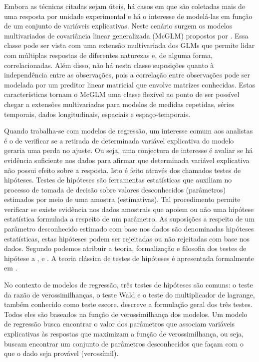 Embora as técnicas citadas sejam úteis, há casos em que são coletadas mais de uma resposta por unidade experimental e há o interesse de modelá-las em função de um conjunto de variáveis explicativas. Neste cenário surgem os modelos multivariados de covariância linear generalizada (McGLM) propostos por \citet{Bonat16}. Essa classe pode ser vista com uma extensão multivariada dos GLMs que permite lidar com múltiplas respostas de diferentes naturezas e, de alguma forma, correlacionadas. Além disso, não há nesta classe suposições quanto à independência entre as observações, pois a correlação entre observações pode ser modelada por um preditor linear matricial que envolve matrizes conhecidas. Estas características tornam o McGLM uma classe flexível ao ponto de ser possível chegar a extensões multivariadas para modelos de medidas repetidas, séries temporais, dados longitudinais, espaciais e espaço-temporais.


Quando trabalha-se com modelos de regressão, um interesse comum aos analistas é o de verificar se a retirada de determinada variável explicativa do modelo geraria uma perda no ajuste. Ou seja, uma conjectura de interesse é avaliar se há evidência suficiente nos dados para afirmar que determinada variável explicativa não possui efeito sobre a resposta. Isto é feito através dos chamados testes de hipóteses. Testes de hipóteses são ferramentas estatísticas que auxiliam no processo de tomada de decisão sobre valores desconhecidos (parâmetros) estimados por meio de uma amostra (estimativas). Tal procedimento permite verificar se existe evidência nos dados amostrais que apoiem ou não uma hipótese estatística formulada a respeito de um parâmetro. As suposições a respeito de um parâmetro desconhecido estimado com base nos dados são denominadas hipóteses estatísticas, estas hipóteses podem ser rejeitadas ou não rejeitadas com base nos dados. Segundo \citet{lehmann} podemos atribuir a teoria, formalização e filosofia dos testes de hipótese a \citet{neyman1}, \citet{neyman2} e \citet{fisher}. A teoria clássica de testes de hipóteses é apresentada formalmente em \citet{lehmann2}.

No contexto de modelos de regressão, três testes de hipóteses são comuns: o teste da razão de verossimilhanças, o teste Wald e o teste do multiplicador de lagrange, também conhecido como teste escore. \citet{engle} descreve a formulação geral dos três testes. Todos eles são baseados na função de verossimilhança dos modelos. Um modelo de regressão busca encontrar o valor dos parâmetros que associam variáveis explicativas às respostas que maximizam a função de verossimilhança, ou seja, buscam encontrar um conjunto de parâmetros desconhecidos que façam com o que o dado seja provável (verossímil).


